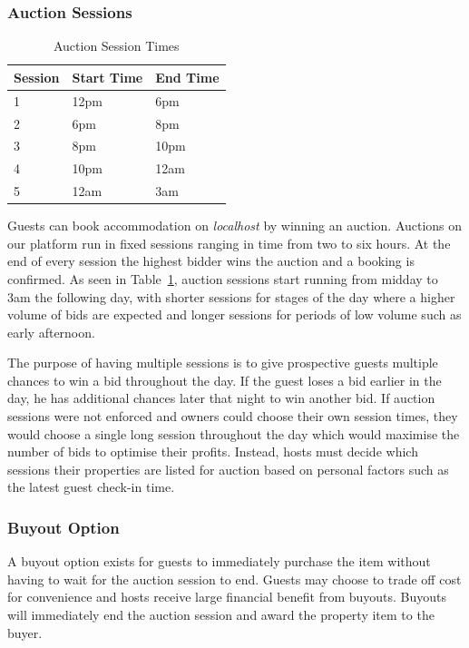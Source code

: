 \subsubsection{Auction Sessions}

\begin{table}[!h]
  \centering
  \begin{tabular}{|l|l|l|}
    \hline
    Session & Start Time & End Time \\ \hline
    1       & 12pm       & 6pm      \\
    2       & 6pm        & 8pm      \\
    3       & 8pm        & 10pm     \\
    4       & 10pm       & 12am     \\
    5       & 12am       & 3am      \\ \hline
  \end{tabular}
  \caption{Auction Session Times}
  \label{tab:sessionTimes}
\end{table}

Guests can book accommodation on \emph{localhost} by winning an auction.
Auctions on our platform run in fixed sessions ranging in time from two to six hours.
At the end of every session the highest bidder wins the auction and a booking is confirmed.
As seen in Table~\ref{tab:sessionTimes},
auction sessions start running from midday to 3am the following day, with shorter sessions
for stages of the day where a higher volume of bids are expected and longer sessions
for periods of low volume such as early afternoon.

The purpose of having multiple sessions is to give prospective guests multiple chances to
win a bid throughout the day. If the guest loses a bid earlier in the day, he has
additional chances later that night to win another bid. If auction
sessions were not enforced and owners could choose their own session times, they
would choose a single long session throughout the day which would
maximise the number of bids to optimise their profits.
Instead, hosts must decide which sessions their properties are listed for auction
based on personal factors such as the latest guest check-in time.

\subsubsection{Buyout Option}
A buyout option exists for guests to immediately purchase
the item without having to wait for the auction session to end. Guests may choose to
trade off cost for convenience and hosts receive large financial benefit from buyouts.
Buyouts will immediately end the auction session and award the property item to the buyer.

